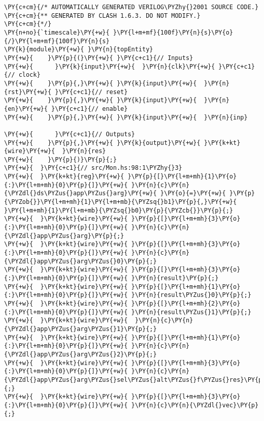 {\scriptsize
\begin{Verbatim}[commandchars=\\\{\}]
\PY{c+cm}{/* AUTOMATICALLY GENERATED VERILOG\PYZhy{}2001 SOURCE CODE.}
\PY{c+cm}{** GENERATED BY CLASH 1.6.3. DO NOT MODIFY.}
\PY{c+cm}{*/}
\PY{n+no}{`timescale}\PY{+w}{ }\PY{l+m+mf}{100f}\PY{n}{s}\PY{o}{/}\PY{l+m+mf}{100f}\PY{n}{s}
\PY{k}{module}\PY{+w}{ }\PY{n}{topEntity}
\PY{+w}{    }\PY{p}{(}\PY{+w}{ }\PY{c+c1}{// Inputs}
\PY{+w}{      }\PY{k}{input}\PY{+w}{  }\PY{n}{clk}\PY{+w}{ }\PY{c+c1}{// clock}
\PY{+w}{    }\PY{p}{,}\PY{+w}{ }\PY{k}{input}\PY{+w}{  }\PY{n}{rst}\PY{+w}{ }\PY{c+c1}{// reset}
\PY{+w}{    }\PY{p}{,}\PY{+w}{ }\PY{k}{input}\PY{+w}{  }\PY{n}{en}\PY{+w}{ }\PY{c+c1}{// enable}
\PY{+w}{    }\PY{p}{,}\PY{+w}{ }\PY{k}{input}\PY{+w}{  }\PY{n}{inp}

\PY{+w}{      }\PY{c+c1}{// Outputs}
\PY{+w}{    }\PY{p}{,}\PY{+w}{ }\PY{k}{output}\PY{+w}{ }\PY{k+kt}{wire}\PY{+w}{  }\PY{n}{res}
\PY{+w}{    }\PY{p}{)}\PY{p}{;}
\PY{+w}{  }\PY{c+c1}{// src/Mon.hs:98:1\PYZhy{}3}
\PY{+w}{  }\PY{k+kt}{reg}\PY{+w}{ }\PY{p}{[}\PY{l+m+mh}{1}\PY{o}{:}\PY{l+m+mh}{0}\PY{p}{]}\PY{+w}{ }\PY{n}{c}\PY{n}{\PYZdl{}ds\PYZus{}app\PYZus{}arg}\PY{+w}{ }\PY{o}{=}\PY{+w}{ }\PY{p}{\PYZob{}}\PY{l+m+mh}{1}\PY{l+m+mb}{\PYZsq{}b1}\PY{p}{,}\PY{+w}{   }\PY{l+m+mh}{1}\PY{l+m+mb}{\PYZsq{}b0}\PY{p}{\PYZcb{}}\PY{p}{;}
\PY{+w}{  }\PY{k+kt}{wire}\PY{+w}{ }\PY{p}{[}\PY{l+m+mh}{3}\PY{o}{:}\PY{l+m+mh}{0}\PY{p}{]}\PY{+w}{ }\PY{n}{c}\PY{n}{\PYZdl{}app\PYZus{}arg}\PY{p}{;}
\PY{+w}{  }\PY{k+kt}{wire}\PY{+w}{ }\PY{p}{[}\PY{l+m+mh}{3}\PY{o}{:}\PY{l+m+mh}{0}\PY{p}{]}\PY{+w}{ }\PY{n}{c}\PY{n}{\PYZdl{}app\PYZus{}arg\PYZus{}0}\PY{p}{;}
\PY{+w}{  }\PY{k+kt}{wire}\PY{+w}{ }\PY{p}{[}\PY{l+m+mh}{3}\PY{o}{:}\PY{l+m+mh}{0}\PY{p}{]}\PY{+w}{ }\PY{n}{result}\PY{p}{;}
\PY{+w}{  }\PY{k+kt}{wire}\PY{+w}{ }\PY{p}{[}\PY{l+m+mh}{1}\PY{o}{:}\PY{l+m+mh}{0}\PY{p}{]}\PY{+w}{ }\PY{n}{result\PYZus{}0}\PY{p}{;}
\PY{+w}{  }\PY{k+kt}{wire}\PY{+w}{ }\PY{p}{[}\PY{l+m+mh}{2}\PY{o}{:}\PY{l+m+mh}{0}\PY{p}{]}\PY{+w}{ }\PY{n}{result\PYZus{}1}\PY{p}{;}
\PY{+w}{  }\PY{k+kt}{wire}\PY{+w}{  }\PY{n}{c}\PY{n}{\PYZdl{}app\PYZus{}arg\PYZus{}1}\PY{p}{;}
\PY{+w}{  }\PY{k+kt}{wire}\PY{+w}{ }\PY{p}{[}\PY{l+m+mh}{1}\PY{o}{:}\PY{l+m+mh}{0}\PY{p}{]}\PY{+w}{ }\PY{n}{c}\PY{n}{\PYZdl{}app\PYZus{}arg\PYZus{}2}\PY{p}{;}
\PY{+w}{  }\PY{k+kt}{wire}\PY{+w}{ }\PY{p}{[}\PY{l+m+mh}{3}\PY{o}{:}\PY{l+m+mh}{0}\PY{p}{]}\PY{+w}{ }\PY{n}{c}\PY{n}{\PYZdl{}app\PYZus{}arg\PYZus{}sel\PYZus{}alt\PYZus{}f\PYZus{}res}\PY{p}{;}
\PY{+w}{  }\PY{k+kt}{wire}\PY{+w}{ }\PY{p}{[}\PY{l+m+mh}{3}\PY{o}{:}\PY{l+m+mh}{0}\PY{p}{]}\PY{+w}{ }\PY{n}{c}\PY{n}{\PYZdl{}vec}\PY{p}{;}

\end{Verbatim}}

